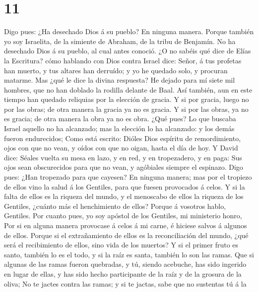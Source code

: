 \hypertarget{section-10}{%
\section{11}\label{section-10}}

 Digo pues: ¿Ha desechado Dios á su pueblo? En ninguna
manera. Porque también yo soy Israelita, de la simiente de Abraham, de
la tribu de Benjamín.  No ha desechado Dios á su pueblo, al
cual antes conoció. ¿O no sabéis qué dice de Elías la Escritura? cómo
hablando con Dios contra Israel dice:  Señor, á tus profetas
han muerto, y tus altares han derruído; y yo he quedado solo, y procuran
matarme.  Mas ¿qué le dice la divina respuesta? He dejado
para mí siete mil hombres, que no han doblado la rodilla delante de
Baal.  Así también, aun en este tiempo han quedado reliquias
por la elección de gracia.  Y si por gracia, luego no por
las obras; de otra manera la gracia ya no es gracia. Y si por las obras,
ya no es gracia; de otra manera la obra ya no es obra.  ¿Qué
pues? Lo que buscaba Israel aquello no ha alcanzado; mas la elección lo
ha alcanzado: y los demás fueron endurecidos;  Como está
escrito: Dióles Dios espíritu de remordimiento, ojos con que no vean, y
oídos con que no oigan, hasta el día de hoy.  Y David dice:
Séales vuelta su mesa en lazo, y en red, y en tropezadero, y en paga:
 Sus ojos sean obscurecidos para que no vean, y agóbiales
siempre el espinazo.  Digo pues: ¿Han tropezado para que
cayesen? En ninguna manera; mas por el tropiezo de ellos vino la salud á
los Gentiles, para que fuesen provocados á celos.  Y si la
falta de ellos es la riqueza del mundo, y el menoscabo de ellos la
riqueza de los Gentiles, ¿cuánto más el henchimiento de ellos?
 Porque á vosotros hablo, Gentiles. Por cuanto pues, yo soy
apóstol de los Gentiles, mi ministerio honro,  Por si en
alguna manera provocase á celos á mi carne, é hiciese salvos á algunos
de ellos.  Porque si el extrañamiento de ellos es la
reconciliación del mundo, ¿qué será el recibimiento de ellos, sino vida
de los muertos?  Y si el primer fruto es santo, también lo
es el todo, y si la raíz es santa, también lo son las ramas.
 Que si algunas de las ramas fueron quebradas, y tú, siendo
acebuche, has sido ingerido en lugar de ellas, y has sido hecho
participante de la raíz y de la grosura de la oliva;  No te
jactes contra las ramas; y si te jactas, sabe que no sustentas tú á la
